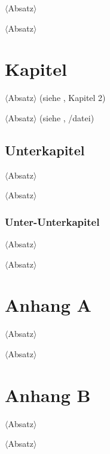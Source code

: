 \documentclass{scrartcl}
\begin{document}
\noindent $\langle$Absatz$\rangle$

\vspace{10pt}
\noindent $\langle$Absatz$\rangle$
	
\section{Kapitel}

\noindent $\langle$Absatz$\rangle$ (siehe \cite{bookRef1}, Kapitel 2)

\vspace{10pt}
\noindent $\langle$Absatz$\rangle$ (siehe \cite{websiteRef1}, /datei)

\subsection{Unterkapitel}

\noindent $\langle$Absatz$\rangle$

\vspace{10pt}
\noindent $\langle$Absatz$\rangle$

\subsubsection{Unter-Unterkapitel}

\noindent $\langle$Absatz$\rangle$

\vspace{10pt}
\noindent $\langle$Absatz$\rangle$

\section*{Anhang A}

\noindent $\langle$Absatz$\rangle$

\vspace{10pt}
\noindent $\langle$Absatz$\rangle$

\section*{Anhang B}

\noindent $\langle$Absatz$\rangle$

\vspace{10pt}
\noindent $\langle$Absatz$\rangle$



\end{document}
